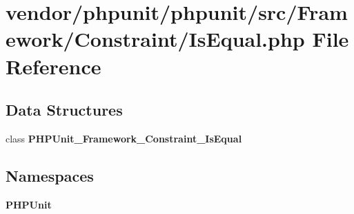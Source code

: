 \section{vendor/phpunit/phpunit/src/\+Framework/\+Constraint/\+Is\+Equal.php File Reference}
\label{_is_equal_8php}
\subsection*{Data Structures}
\begin{DoxyCompactItemize}
\item 
class {\bf P\+H\+P\+Unit\+\_\+\+Framework\+\_\+\+Constraint\+\_\+\+Is\+Equal}
\end{DoxyCompactItemize}
\subsection*{Namespaces}
\begin{DoxyCompactItemize}
\item 
 {\bf P\+H\+P\+Unit}
\end{DoxyCompactItemize}

